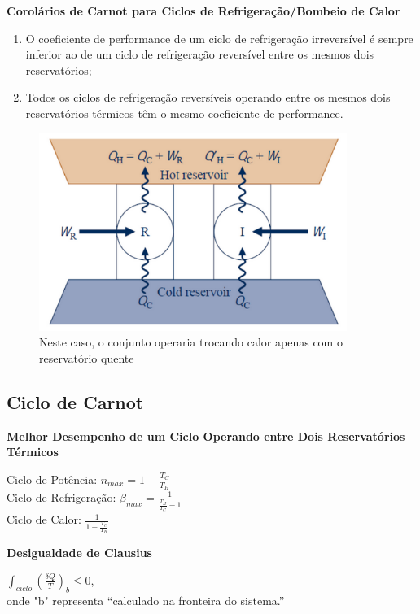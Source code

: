 \documentclass[a4paper, 12pt]{article}
\begin{document}
\textbf{Corolários de Carnot para Ciclos de Refrigeração/Bombeio de Calor}
	\begin{enumerate}
		\item O coeficiente de performance de um ciclo de refrigeração irreversível é
		sempre inferior ao de um ciclo de refrigeração reversível entre os mesmos
		dois reservatórios;
		\item Todos os ciclos de refrigeração reversíveis operando entre os mesmos
		dois reservatórios térmicos têm o mesmo coeficiente de performance.
	\end{enumerate}
	
	\begin{figure}[h]
		\includegraphics[width = 10cm]{rb.png}
		\centering
		\caption{Neste caso, o conjunto 
			operaria trocando calor apenas com o
			reservatório quente}
	\end{figure}
	
\newpage
\subsection{Ciclo de Carnot}
\textbf{Melhor Desempenho de um Ciclo Operando entre Dois Reservatórios Térmicos}
	\begin{center}
		\large
		Ciclo de Potência: $ n_{max} = 1 - \frac{T_C}{T_H} $\\
		Ciclo de Refrigeração: $ \beta_{max} =  \frac{1}{\frac{T_H}{T_C} - 1} $\\
		Ciclo de Calor: $ \frac{1}{1 - \frac{T_C}{T_H}} $
	\end{center}
	
\textbf{Desigualdade de Clausius}
	\begin{center}
		\large
		$ \int_{ciclo} (\frac{\delta Q}{T})_b \leq 0$,\\ onde "b"  representa “calculado na fronteira do
		sistema.”
	\end{center}
	
\end{document}
